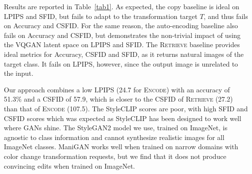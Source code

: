 \begin{table}
\centering
\small
{}
\caption{Evaluation  of \ours and baselines on ImageNet images. %
}
\label{tab1}
\vspace{-2em}
\end{table}

Results are reported in Table~\ref{tab1}. 
As expected, the copy baseline is ideal on LPIPS and SFID, but fails to adapt to the 
transformation target $T$, and thus fails on Accuracy and CSFID.
For the same reason, the auto-encoding baseline also fails on Accuracy and CSFID, but 
demonstrates the non-trivial impact of using the VQGAN latent space on LPIPS and SFID. 
The \textsc{Retrieve} baseline provides ideal metrics for Accuracy, CSFID and SFID, as 
it returns natural images of the target class. 
It fails  on LPIPS, however, since the output image is unrelated to the input. 


Our \ours approach  combines a  low LPIPS (24.7  for \textsc{Encode}) with an 
accuracy of 51.3\% and a CSFID of 57.9, which is closer to the CSFID of
\textsc{Retrieve} (27.2) than that of \textsc{Encode} (107.5).
The StyleCLIP scores are poor, with high SFID and CSFID scores which was expected as 
StyleCLIP has been designed to work well where GANs shine.
The StyleGAN2 model we use, trained on ImageNet, is agnostic to class information and 
cannot synthesize realistic images for all ImageNet classes.
ManiGAN works well when trained on narrow domains with color change transformation 
requests, but we find that it does not produce convincing edits when trained on 
ImageNet.

